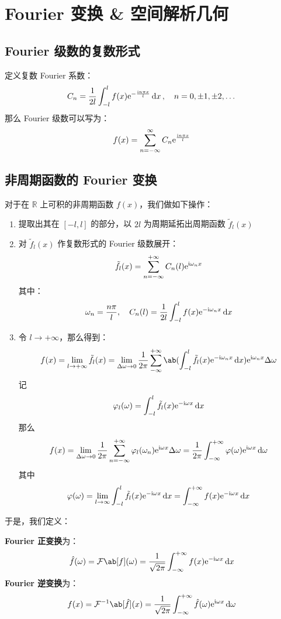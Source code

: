 \section{Fourier 变换 \& 空间解析几何}

\subsection{Fourier 级数的复数形式}

定义复数 Fourier 系数：
$$
C_n = \frac{1}{2l} \int_{-l}^{l} f(x) \mathrm{e}^{-\frac{\mathrm{i} n \pi x}{l}} \dd{x}, \quad n = 0, \pm 1, \pm 2, \dots
$$
那么 Fourier 级数可以写为：
$$
f(x) = \sum_{n = -\infty}^{\infty} C_n \mathrm{e}^{\frac{\mathrm{i} n \pi x}{l}}
$$

\subsection{非周期函数的 Fourier 变换}

对于在 $\mathbb{R}$ 上可积的非周期函数 $f(x)$，我们做如下操作：

\begin{enumerate}
    \item 提取出其在 $[-l, l]$ 的部分，以 $2l$ 为周期延拓出周期函数 $\tilde{f}_l(x)$
    \item 对 $\tilde{f}_l(x)$ 作复数形式的 Fourier 级数展开：
    $$
    \tilde{f}_l(x) = \sum_{n = -\infty}^{+\infty} C_n(l) \mathrm{e}^{\mathrm{i} \omega_n x}
    $$
    其中：
    $$
    \omega_n = \frac{n \pi}{l}, \quad C_n(l) = \frac{1}{2l} \int_{-l}^{l} f(x) \mathrm{e}^{-\mathrm{i} \omega_n x} \dd{x}
    $$
    \item 令 $l \to +\infty$，那么得到：
    $$
    f(x) = \lim_{l \to +\infty} \tilde{f}_l(x) = \lim_{\Delta \omega \to 0} \frac{1}{2\pi} \sum_{-\infty}^{+\infty} \ab(\int_{-l}^{l} \tilde{f}_l(x) \E^{-\I \omega_n x} \dd{x}) \E^{\I \omega_n x} \Delta \omega
    $$
    记
    $$
    \varphi_l(\omega) = \int_{-l}^{l} \tilde{f}_l(x) \mathrm{e}^{-\mathrm{i} \omega x} \dd{x}
    $$
    那么
    $$
    f(x) = \lim_{\Delta \omega \to 0} \frac{1}{2\pi} \sum_{n = -\infty}^{+\infty} \varphi_l(\omega_n) \mathrm{e}^{\mathrm{i} \omega x} \Delta \omega = \frac{1}{2\pi} \int_{-\infty}^{+\infty} \varphi(\omega) \mathrm{e}^{\mathrm{i} \omega x} \dd{\omega}
    $$
    其中
    $$
    \varphi(\omega) = \lim_{l \to \infty} \int_{-l}^{l} \tilde{f}_l(x) \mathrm{e}^{-\mathrm{i} \omega x} \dd{x} = \int_{-\infty}^{+\infty} f(x) \mathrm{e}^{-\mathrm{i} \omega x} \dd{x}
    $$
\end{enumerate}

于是，我们定义：

\begin{definition}[Fourier 变换]
    \textbf{Fourier 正变换}为：
    $$
    \hat{f}(\omega) = \mathcal{F}\ab[f](\omega) = \frac{1}{\sqrt{2\pi}} \int_{-\infty}^{+\infty} f(x) \E^{-\I \omega x} \dd{x}
    $$
    \textbf{Fourier 逆变换}为：
    $$
    f(x) = \mathcal{F}^{-1}\ab[\hat{f}](x) = \frac{1}{\sqrt{2\pi}} \int_{-\infty}^{+\infty} \hat{f}(\omega) \E^{\I \omega x} \dd{\omega}
    $$
\end{definition}

